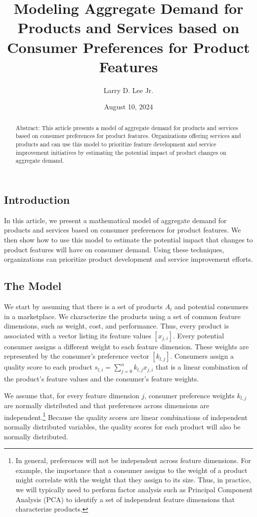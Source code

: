 \documentclass[]{article}
\title{Modeling Aggregate Demand for Products and Services based on Consumer Preferences for Product Features}
\date{August 10, 2024}
\author{Larry D. Lee Jr.}
\begin{document}
\maketitle

\begin{abstract}
Abstract: This article presents a model of aggregate demand for products
and services based on consumer preferences for product features.
Organizations offering services and products and can use this model to
prioritize feature development and service improvement initiatives by
estimating the potential impact of product changes on aggregate demand.
\end{abstract}

\hypertarget{introduction}{%
\subsection{Introduction}\label{introduction}}

In this article, we present a mathematical model of aggregate demand for
products and services based on consumer preferences for product
features. We then show how to use this model to estimate the potential
impact that changes to product features will have on consumer demand.
Using these techniques, organizations can prioritize product development
and service improvement efforts.

\hypertarget{the-model}{%
\subsection{The Model}\label{the-model}}

We start by assuming that there is a set of products \(A_i\) and
potential consumers in a marketplace. We characterize the products using
a set of common feature dimensions, such as weight, cost, and
performance. Thus, every product is associated with a vector listing its
feature values \([x_{j,i}]\). Every potential consumer assigns a
different weight to each feature dimension. These weights are
represented by the consumer's preference vector \([k_{l,j}]\). Consumers
assign a quality score to each product
\(s_{l,i} = \sum_{j=0}^n k_{l,j} x_{j,i}\) that is a linear combination
of the product's feature values and the consumer's feature weights.

We assume that, for every feature dimension \(j\), consumer preference
weights \(k_{l,j}\) are normally distributed and that preferences across
dimensions are independent.\footnote{In general, preferences will not be
  independent across feature dimensions. For example, the importance
  that a consumer assigns to the weight of a product might correlate
  with the weight that they assign to its size. Thus, in practice, we
  will typically need to perform factor analysis such as Principal
  Component Analysis (PCA) to identify a set of independent feature
  dimensions that characterize products. } Because the quality scores
are linear combinations of independent normally distributed variables,
the quality scores for each product will also be normally distributed.
\end{document}
